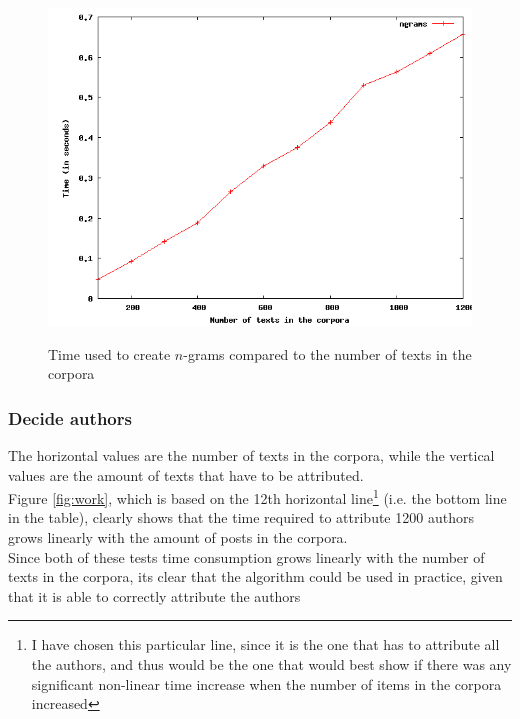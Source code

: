 \begin{figure}[!hbp]
\includegraphics[width=\textwidth]{tabeller/ngram.png}\\
\caption{Time used to create $n$-grams compared to the number of texts in the corpora\label{fig:ngram}}
\end{figure}

\subsubsection{Decide authors}
The horizontal values are the number of texts in the corpora, while the vertical values are the amount of texts that have to be attributed.\\


Figure \ref{fig:work}, which is based on the 12th horizontal line\footnote{I have chosen this particular line, since it is the one that has to attribute all the authors, and thus would be the one that would best show if there was any significant non-linear time increase when the number of items in the corpora increased} (i.e. the bottom line in the table), clearly shows that the time required to attribute 1200 authors grows linearly with the amount of posts in the corpora.\\

Since both of these tests time consumption grows linearly with the number of texts in the corpora, its clear that the algorithm could be used in practice, given that it is able to correctly attribute the authors  

